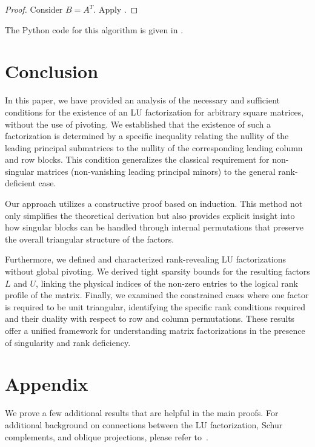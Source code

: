 \documentclass{article}
\begin{document}
\begin{proof}
    Consider $B = A^T$. Apply .
\end{proof}

The Python code for this algorithm is given in .

\section{Conclusion}

In this paper, we have provided an analysis of the necessary and sufficient conditions for the existence of an LU factorization for arbitrary square matrices, without the use of pivoting. We established that the existence of such a factorization is determined by a specific inequality relating the nullity of the leading principal submatrices to the nullity of the corresponding leading column and row blocks. This condition generalizes the classical requirement for non-singular matrices (non-vanishing leading principal minors) to the general rank-deficient case.

Our approach utilizes a constructive proof based on induction. This method not only simplifies the theoretical derivation but also provides explicit insight into how singular blocks can be handled through internal permutations that preserve the overall triangular structure of the factors.

Furthermore, we defined and characterized rank-revealing LU factorizations without global pivoting. We derived tight sparsity bounds for the resulting factors $L$ and $U$, linking the physical indices of the non-zero entries to the logical rank profile of the matrix. Finally, we examined the constrained cases where one factor is required to be unit triangular, identifying the specific rank conditions required and their duality with respect to row and column permutations. These results offer a unified framework for understanding matrix factorizations in the presence of singularity and rank deficiency.

\appendix

\section{Appendix}\label{sec:appendix}

We prove a few additional results that are helpful in the main proofs. For additional background on connections between the LU factorization, Schur complements, and oblique projections, please refer to~\cite{Ouellette_1981,Zhang_2006,Householder_2013}.
\end{document}

